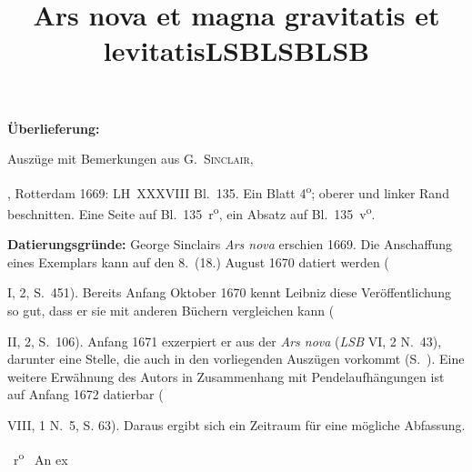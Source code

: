 %  
%				
%
%
%
\frenchspacing
%
\begin{ledgroupsized}[r]{120mm}
\footnotesize
\pstart
\noindent\textbf{Überlieferung:}
\pend
\end{ledgroupsized}
%
\begin{ledgroupsized}[r]{114mm}
\footnotesize
\pstart \parindent -6mm
%
Auszüge mit Bemerkungen aus
\protect{}\textsc{G.~Sinclair},
\title{Ars nova et magna gravitatis et levitatis}, Rotterdam 1669\cite{00546}: 
LH~XXXVIII Bl.~135. 
Ein Blatt 4\textsuperscript{o};
oberer und linker Rand beschnitten.
Eine Seite auf Bl.~135~r\textsuperscript{o}, ein Absatz auf Bl.~135~v\textsuperscript{o}.
\pend
\end{ledgroupsized}
%
%
\vspace{5mm}
\begin{ledgroup}
\footnotesize
\pstart
\noindent%
\textbf{Datierungsgründe:}	
%
George Sinclairs\protect{}
%
\textit{Ars nova}\cite{00546} erschien 1669. 
%
Die Anschaffung eines Exemplars kann auf den 8.\ (18.) August 1670 datiert werden 
%
(\title{LSB} I, 2, S.~451). Bereits Anfang Oktober 1670 kennt Leibniz diese Veröffentlichung so gut, 
%
dass er sie mit anderen Büchern vergleichen kann (\title{LSB} II, 2, S.~106). 
%
Anfang 1671 exzerpiert er aus der \cite{00546}\textit{Ars nova} 
%
(\cite{02074}\textit{LSB} VI, 2 N.~43), darunter eine Stelle, die auch in den vorliegenden Auszügen vorkommt (S.~).
%
Eine weitere Erwähnung des Autors in Zusammenhang mit Pendelaufhängungen ist auf Anfang 1672 datierbar (\cite{02075}\title{LSB} VIII, 1 N.~5, S. 63). 
%
Daraus ergibt sich ein Zeitraum für eine mögliche Abfassung.
\pend 
\end{ledgroup}
%
%
\frenchspacing
\vspace{8mm}
\pstart%
\normalsize%
\noindent%
~r\textsuperscript{o}\rbrack\
\pend
%
\pstart
\centering
An ex 
%
